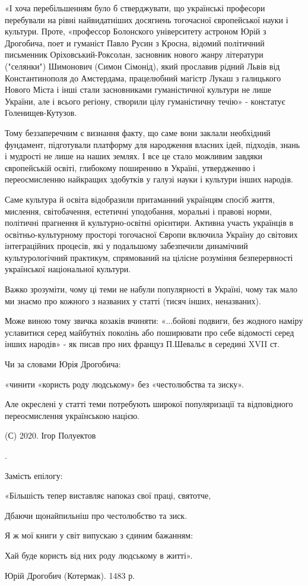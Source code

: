 «І хоча перебільшенням було б стверджувати, що українські професори перебували
на рівні найвидатніших досягнень тогочасної європейської науки і культури.
Проте, «профессор Болонского університету астроном Юрій з Дрогобича, поет и
гуманіст Павло Русин з Кросна, відомий політичний письменник
Оріховський-Роксолан, засновник нового жанру літератури ("селянки") Шимонович
(Симон Сімонід), який прославив рідний Львів від Константинополя до Амстердама,
працелюбний магістр Лукаш з галицького Нового Міста і інші стали засновниками
гуманістичної культури не лише України, але і всього регіону, створили цілу
гуманістичну течію» - констатує Голенищев-Кутузов.

Тому беззаперечним є визнання факту, що саме вони заклали необхідний фундамент,
підготували платформу для народження власних ідей, підходів, знань і мудрості
не лише на наших землях. І все це стало можливим завдяки європейській освіті,
глибокому поширенню в Україні, утвердженню і переосмисленню найкращих здобутків
у галузі науки і культури інших народів. 

Саме культура й освіта відобразили притаманний українцям спосіб життя,
мислення, світобачення, естетичні уподобання, моральні і правові норми,
політичні прагнення й культурно-освітні орієнтири. Активна участь українців в
освітньо-культурному просторі тогочасної Європи включила Україну до світових
інтеграційних процесів, які у подальшому забезпечили динамічний
культурологічний практикум, спрямований на цілісне розуміння безперервності
української національної культури.

Важко зрозуміти, чому ці теми не набули популярності в Україні, чому так мало
ми знаємо про кожного з названих у статті (тисяч інших, неназваних).

Може виною тому звичка козаків вчиняти: «...бойові подвиги, без жодного наміру
уславитися серед майбутніх поколінь або поширювати про себе відомості серед
інших народів» - як писав про них француз П.Шевальє в середині XVII ст.

Чи за словами Юрія Дрогобича:

«чинити «користь роду людському» без «честолюбства та зиску».

Але окреслені у статті теми потребують широкої популяризації та відповідного
переосмислення українською нацією.

(С) 2020. Ігор Полуектов

.

Замість епілогу:

«Більшість тепер виставляє напоказ свої праці, святотче,

Дбаючи щонайпильніш про честолюбство та зиск.

Я ж мої книги у світ випускаю з єдиним бажанням:

Хай буде користь від них роду людському в житті». 

Юрій Дрогобич (Котермак). 1483 р.
